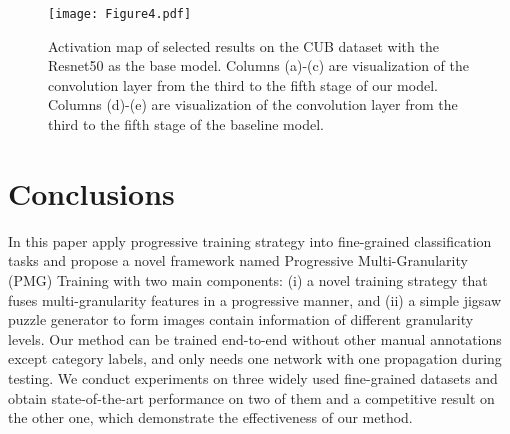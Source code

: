\documentclass{llncs}
\begin{document}
\begin{figure}[!t]
\centering
  \texttt{[image: Figure4.pdf]}
  \caption{Activation map of selected results on the CUB dataset with the Resnet50 as the base model. Columns (a)-(c) are visualization of the convolution layer from the third to the fifth stage of our model. Columns (d)-(e) are visualization of the convolution layer from the third to the fifth stage of the baseline model.}
  \label{fig:visualization}
\end{figure}

\section{Conclusions}

In this paper apply progressive training strategy into fine-grained classification tasks and propose a novel framework named Progressive
Multi-Granularity (PMG) Training with two main components: (i) a novel training strategy that fuses multi-granularity features in a progressive manner, and (ii) a simple jigsaw puzzle generator to form images contain information of different granularity levels. Our method can be trained end-to-end without other manual annotations except category labels, and only needs one network with one propagation during testing. We conduct experiments on three widely used fine-grained datasets and obtain state-of-the-art performance on two of them and a competitive result on the other one, which demonstrate the effectiveness of our method.


\clearpage


\end{document}

